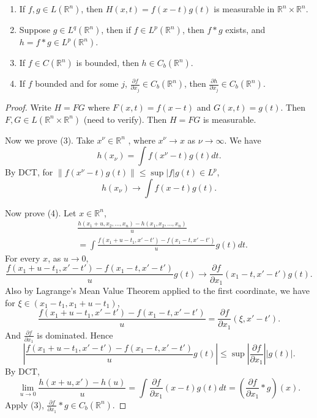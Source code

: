 \begin{theorem}
	\begin{enumerate}
		\item 
	If $f, g \in L(\mathbb{R}^n)$, then $H(x,t) = f(x-t) g(t)$ is measurable in $\mathbb{R}^n \times \mathbb{R}^n$. 
\item Suppose $g \in L^q(\mathbb{R}^n)$, then if $f \in L^p(\mathbb{R}^n)$, then $f * g$ exists, and $h = f * g \in L^p(\mathbb{R}^n)$.
\item If $f \in C(\mathbb{R}^n)$ is bounded, then $h \in C_b(\mathbb{R}^n)$.
\item  If $f$ bounded and for some $j$, $\frac{\partial f}{\partial x_j} \in C_b(\mathbb{R}^n)$, then $\frac{\partial h}{\partial x_j}  \in C_b(\mathbb{R}^n)$.
	\end{enumerate}
\end{theorem}
\begin{proof}
	Write $H = FG$ where $F(x,t) = f(x-t)$ and  $G(x,t) = g(t)$.  Then $F, G \in L(\mathbb{R}^n \times \mathbb{R}^n)$ (need to verify). Then $H = F G$ is measurable.

	Now we prove (3). Take  $x^\nu \in \mathbb{R}^n$ , where $x ^\nu \to x$ as $\nu \to \infty $. We have
	\[
		h(x_\nu) = \int f(x^\nu - t) g(t) d t
	.\] 
	By DCT, for $\|f(x^\nu - t) g(t)\|\le  \sup |f| g(t) \in L^p$,
	 \[
		h(x_\nu) \to  \int f(x -t) g(t)
	.\] 
	
	Now prove (4). Let $x \in \mathbb{R}^n$, 
	\begin{align*}
		&\frac{h(x_1 + u, x_2, \ldots, x_n) - h(x_1, x_2, \ldots, x_n)}{u}\\
		&= \int \frac{f(x_1 + u - t_1, x' - t') - f(x_1 - t, x' - t')}{u} g(t) dt
	.\end{align*}
	For every $x$, as $u \to  0$,
	\[
		\frac{f(x_1 + u - t_1, x' - t') - f(x_1 - t, x' - t')}{u} g(t) \to 
		\frac{\partial f}{\partial x_1}  (x_1 - t, x' - t') g(t)
	.\] 
	Also by Lagrange's Mean Value Theorem applied to the first coordinate, we have for $\xi \in (x_1 - t_1, x_1 + u - t_1)$,
	\[
		\frac{f(x_1 + u - t_1, x' - t') - f(x_1 - t, x' - t')}{u} = \frac{\partial f}{\partial x_1} (\xi, x' - t')
	.\] 
	And $\frac{\partial f}{\partial x_1} $ is dominated. Hence
	\[
		\left| \frac{f(x_1 + u - t_1, x' - t') - f(x_1 - t, x' - t')}{u} g(t) \right|  \le  \sup \left| \frac{\partial f}{\partial x_1}  \right|  \left| g(t) \right| 
	.\] 
	By DCT,
	\[
		\lim_{u \to 0} \frac{h(x+u, x') - h(u)}{u} 
		= \int  \frac{\partial f}{\partial x_1}  (x - t) g(t) dt
		= \left( \frac{\partial f}{\partial x_1}  * g \right) (x)
	.\] 
	Apply (3), $\frac{\partial f}{\partial x_1} * g \in C_b(\mathbb{R}^n)$.

\end{proof}

